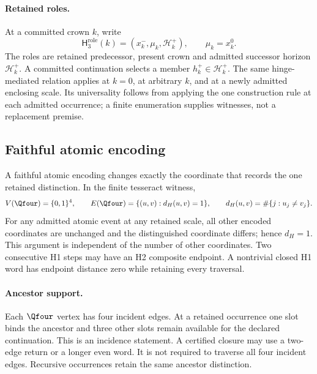 \paragraph{Retained roles.}
\label{subsec:hinge-triad}
At a committed crown \(k\), write
\begin{equation}
\mathsf H_3^{\mathrm{role}}(k)=(x_k^-,\mu_k,\mathcal H_k^+),\qquad \mu_k=x_k^0.
\label{eq:hinge-triad}
\end{equation}
The roles are retained predecessor, present crown and admitted successor
horizon \(\mathcal H_k^+\). A committed continuation selects a member
\(h_k^+\in\mathcal H_k^+\). The same hinge-mediated relation applies at \(k=0\), at arbitrary
\(k\), and at a newly admitted enclosing scale. Its universality follows from
applying the one construction rule at each admitted occurrence; a finite
enumeration supplies witnesses, not a replacement premise.

\subsection{Faithful atomic encoding}
\label{subsec:fractal-tesseract}
\label{subsec:fractal-recursive-support}
\label{subsec:four-edge-x-witness}
\label{subsec:q4-four-edge-implementation}
A faithful atomic encoding changes exactly the coordinate that records the
one retained distinction. In the finite tesseract witness,
\begin{equation}
V(\Qfour)=\{0,1\}^4,\qquad
E(\Qfour)=\{(u,v):d_H(u,v)=1\},\qquad
d_H(u,v)=\#\{j:u_j\ne v_j\}.
\label{eq:atomic-h1}
\end{equation}
For any admitted atomic event at any retained scale, all other encoded
coordinates are unchanged and the distinguished coordinate differs; hence
\(d_H=1\). This argument is independent of the number of other coordinates.
Two consecutive H1 steps may have an H2 composite endpoint. A nontrivial
closed H1 word has endpoint distance zero while retaining every traversal.

\paragraph{Ancestor support.}
\label{subsec:four-edge-ancestor}
Each \(\Qfour\) vertex has four incident edges. At a retained occurrence one
slot binds the ancestor and three other slots remain available for the declared
continuation. This is an incidence statement. A certified closure may use a
two-edge return or a longer even word. It is not required to traverse all four
incident edges. Recursive occurrences retain the same ancestor distinction.


